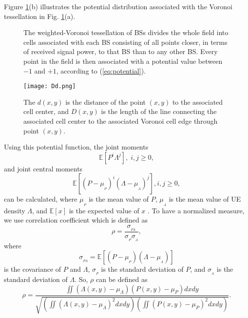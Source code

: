 \documentclass[journal]{IEEEtran}
\begin{document}
Figure \ref{fig:infra}(b) illustrates the potential distribution associated with the Voronoi tessellation in Fig. \ref{fig:infra}(a).

\begin{figure}
\centering
{}
\caption{The weighted-Voronoi tessellation of BSs divides the whole field into cells associated with each BS consisting of all points closer, in terms of received signal power, to that BS than to any other BS. Every point in the field is then associated with a potential value between $-1$ and $+1$, according to (\ref{eq:potential}).}
\label{fig:infra}
\end{figure}

\begin{figure}
\centering
\texttt{[image: Dd.png]}
\caption{The $d(x,y)$ is the distance of the point $(x,y)$ to the associated cell center, and $D(x,y)$ is the length of the line connecting the associated cell center to the associated Voronoi cell edge through point $(x,y)$.}
\label{fig:Dd}
\end{figure}

Using this potential function, the joint moments
\begin{equation}
\mathbb{E}\left [ P^{i}\Lambda^{j} \right ], \; i,j \ge 0,
\end{equation}
and joint central moments
\begin{equation}
\mathbb{E}\left [ (P-\mu_{_{P}})^{i} (\Lambda-\mu_{_{\Lambda}})^{j} \right ], i,j \ge 0,
\end{equation}
can be calculated, where $\mu_{_{P}}$ is the mean value of $P$, $\mu_{_{\Lambda}}$ is the mean value of UE density $\Lambda$, and $\mathbb{E} \left [ x \right ]$ is the expected value of $x$ \cite{alberto1994probability}. To have a normalized measure, we use correlation coefficient which is defined as
\begin{equation}
\rho = \frac{\sigma_{_{P\Lambda}}}{\sigma_{_{P}}\sigma_{_{\Lambda}}},
\end{equation}
where
\begin{equation}
\sigma_{_{P\Lambda}} = \mathbb{E}\left [ (P-\mu_{_{P}})(\Lambda-\mu_{_{\Lambda}}) \right ]
\end{equation}
is the covariance of $P$ and $\Lambda$, $\sigma_{_{P}}$ is the standard deviation of $P$, and $\sigma_{_{\Lambda}}$ is the standard deviation of $\Lambda$. So, $\rho$ can be defined as
\begin{equation}
\rho = \frac{\iint ( \Lambda(x,y)-\mu_{\Lambda})(P(x,y)-\mu_{P})dxdy}{\sqrt{(\iint( \Lambda(x,y)-\mu_{\Lambda})^{2}dxdy)(\iint(P(x,y)-\mu_{P})^{2}dxdy)}}.
\end{equation}
\end{document}
